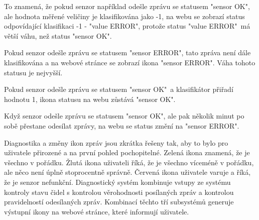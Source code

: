 To znamená, že pokud senzor například odešle zprávu se statusem "sensor OK", ale hodnota měřené veličiny je klasifikována jako -1, na webu se zobrazí status odpovídající klasifikaci -1 - "value ERROR", protože status "value ERROR"\ má větší váhu, než status "sensor OK". \par
Pokud senzor odešle zprávu se statusem "sensor ERROR", tato zpráva není dále klasifikována a na webové stránce se zobrazí ikona "sensor ERROR". Váha tohoto statusu je nejvyšší. \par
Pokud senzor odešle zprávu se statusem "sensor OK"\ a klasifikátor přiřadí hodnotu 1, ikona statusu na webu zůstává "sensor OK". \par
Když senzor odešle zprávu se statusem "sensor OK", ale pak několik minut po sobě přestane odesílat zprávy, na webu se status změní na "sensor ERROR". \par
Diagnostika a změny ikon zpráv jsou zkrátka řešeny tak, aby to bylo pro uživatele přirozené a na první pohled pochopitelné. Zelená ikona znamená, že je všechno v pořádku. Žlutá ikona uživateli říká, že je všechno víceméně v pořádku, ale něco není úplně stoprocentně správně. Červená ikona uživatele varuje a říká, že je senzor nefunkční. Diagnostický systém kombinuje vstupy ze systému kontroly stavu čidel s kontrolou věrohodnosti posílaných zpráv a kontrolou pravidelností odesílaných zpráv. Kombinací těchto tří subsystémů generuje výstupní ikony na webové stránce, které informují uživatele.